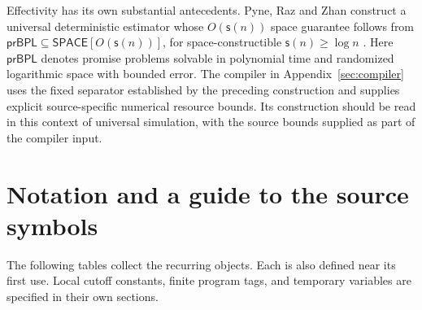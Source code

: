 \documentclass[11pt]{article}
\numberwithin{equation}{section}
\theoremstyle{definition}
\theoremstyle{remark}
\begin{document}
Effectivity has its own substantial antecedents.
Pyne, Raz and Zhan construct a universal deterministic estimator whose
$O({\mathsf{s}}(n))$ space guarantee follows from
$\mathsf{prBPL}\subseteq\mathsf{SPACE}[O({\mathsf{s}}(n))]$, for
space-constructible ${\mathsf{s}}(n)\ge\log n$
\cite[full version, Theorem~5.1]{PyneRazZhan2023}.
Here $\mathsf{prBPL}$ denotes promise problems solvable in polynomial
time and randomized logarithmic space with bounded error.
The compiler in Appendix~\ref{sec:compiler} uses the fixed separator established by the preceding construction
and supplies explicit source-specific numerical resource bounds.
Its construction should be read in this context of universal
simulation, with the source bounds supplied as part of the compiler input.





\section{Notation and a guide to the source symbols}
\label{sec:notation}

The following tables collect the recurring objects. Each is also defined near its first use. Local cutoff constants, finite program tags, and temporary variables are specified in their own sections.
\end{document}
